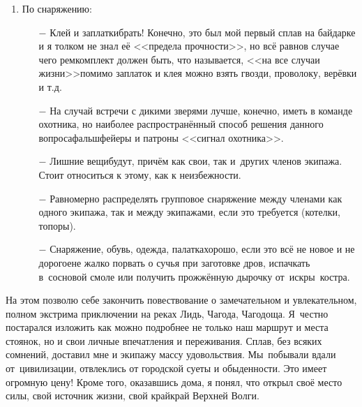 \begin{enumerate}
		\begin{enumerate}
		\setlength{\itemindent}{0em}
		\item [$-$] С особой тщательностью следует подбирать экипажи и только в самых крайних случаях идти с~малознакомыми людьми. Про незнакомых я вообще молчу\mdash этого, по возможности, следует избегать. Исключение\mdash всякие коммерческие сплавы.
		\item [$-$] На трёхместных байдарках физически сильных гребцов следует размещать на корме и носу\mdash так проще управлять байдаркой и совершать маневрирование. 
	\end{enumerate}
	\item По снаряжению:
	\begin{enumerate}
		\setlength{\itemindent}{0em}
		\item [$-$] Клей и заплатки\mdash брать! Конечно, это был мой первый сплав на байдарке и я толком не знал её <<предела прочности>>, но всё равно\mdash в случае чего ремкомплект должен быть, что называется, <<на все случаи жизни>>\mdash помимо заплаток и клея можно взять гвозди, проволоку, верёвки и т.д.
		\item [$-$] На случай встречи с дикими зверями лучше, конечно, иметь в команде охотника, но наиболее распространённый способ решения данного вопроса\mdash фальшфейеры и патроны <<сигнал охотника>>.
		\item [$-$] Лишние вещи\mdash будут, причём как свои, так и~других членов экипажа. Стоит относиться к этому, как к неизбежности.
		\item [$-$] Равномерно распределять групповое снаряжение между членами как одного экипажа, так и между экипажами, если это требуется (котелки, топоры).
		\item [$-$] Снаряжение, обувь, одежда, палатка\mdash хорошо, если это всё не новое и не дорогое\mdash не жалко порвать о сучья при заготовке дров, испачкать в~сосновой смоле или получить прожжённую дырочку от~искры~костра.
	\end{enumerate}
\end{enumerate}

На этом позволю себе закончить повествование о замечательном и увлекательном, полном экстрима приключении на реках Лидь, Чагода, Чагодоща. Я~честно постарался изложить как можно подробнее не только наш маршрут и места стоянок, но и свои личные впечатления и переживания. Сплав, без всяких сомнений, доставил мне и экипажу массу удовольствия. Мы~побывали вдали от~цивилизации, отвлеклись от городской суеты и обыденности. Это имеет огромную цену! Кроме того, оказавшись дома, я понял, что открыл своё место силы, свой источник жизни, свой край\mdash край Верхней Волги.

